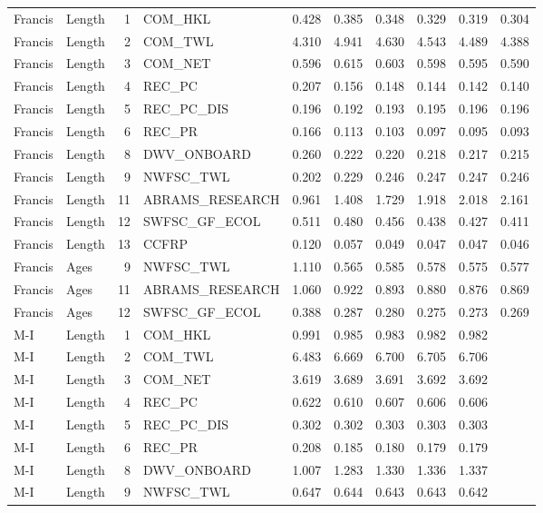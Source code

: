 \documentclass[
  english,
  a4paper,
]{article}
\begin{document}
\begin{landscape}
\begin{longtable}[t]{llrlrrrrrr}
\endfoot
\bottomrule
\endlastfoot
Francis & Length & 1 & COM\_HKL & 0.428 & 0.385 & 0.348 & 0.329 & 0.319 & 0.304\\
Francis & Length & 2 & COM\_TWL & 4.310 & 4.941 & 4.630 & 4.543 & 4.489 & 4.388\\
Francis & Length & 3 & COM\_NET & 0.596 & 0.615 & 0.603 & 0.598 & 0.595 & 0.590\\
Francis & Length & 4 & REC\_PC & 0.207 & 0.156 & 0.148 & 0.144 & 0.142 & 0.140\\
Francis & Length & 5 & REC\_PC\_DIS & 0.196 & 0.192 & 0.193 & 0.195 & 0.196 & 0.196\\
Francis & Length & 6 & REC\_PR & 0.166 & 0.113 & 0.103 & 0.097 & 0.095 & 0.093\\
Francis & Length & 8 & DWV\_ONBOARD & 0.260 & 0.222 & 0.220 & 0.218 & 0.217 & 0.215\\
Francis & Length & 9 & NWFSC\_TWL & 0.202 & 0.229 & 0.246 & 0.247 & 0.247 & 0.246\\
Francis & Length & 11 & ABRAMS\_RESEARCH & 0.961 & 1.408 & 1.729 & 1.918 & 2.018 & 2.161\\
Francis & Length & 12 & SWFSC\_GF\_ECOL & 0.511 & 0.480 & 0.456 & 0.438 & 0.427 & 0.411\\
Francis & Length & 13 & CCFRP & 0.120 & 0.057 & 0.049 & 0.047 & 0.047 & 0.046\\
Francis & Ages & 9 & NWFSC\_TWL & 1.110 & 0.565 & 0.585 & 0.578 & 0.575 & 0.577\\
Francis & Ages & 11 & ABRAMS\_RESEARCH & 1.060 & 0.922 & 0.893 & 0.880 & 0.876 & 0.869\\
Francis & Ages & 12 & SWFSC\_GF\_ECOL & 0.388 & 0.287 & 0.280 & 0.275 & 0.273 & 0.269\\
M-I & Length & 1 & COM\_HKL & 0.991 & 0.985 & 0.983 & 0.982 & 0.982 & \\
M-I & Length & 2 & COM\_TWL & 6.483 & 6.669 & 6.700 & 6.705 & 6.706 & \\
M-I & Length & 3 & COM\_NET & 3.619 & 3.689 & 3.691 & 3.692 & 3.692 & \\
M-I & Length & 4 & REC\_PC & 0.622 & 0.610 & 0.607 & 0.606 & 0.606 & \\
M-I & Length & 5 & REC\_PC\_DIS & 0.302 & 0.302 & 0.303 & 0.303 & 0.303 & \\
M-I & Length & 6 & REC\_PR & 0.208 & 0.185 & 0.180 & 0.179 & 0.179 & \\
M-I & Length & 8 & DWV\_ONBOARD & 1.007 & 1.283 & 1.330 & 1.336 & 1.337 & \\
M-I & Length & 9 & NWFSC\_TWL & 0.647 & 0.644 & 0.643 & 0.643 & 0.642 & \\

\end{longtable}
\end{landscape}
\end{document}
